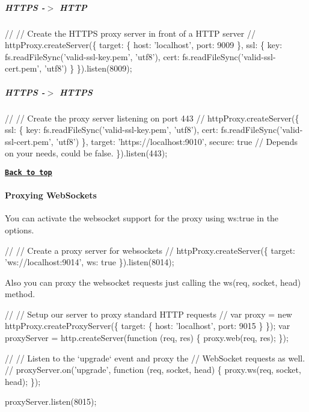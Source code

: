 \subparagraph*{H\+T\+T\+PS -\/$>$ H\+T\+TP}


\begin{DoxyCode}
//
// Create the HTTPS proxy server in front of a HTTP server
//
httpProxy.createServer(\{
  target: \{
    host: 'localhost',
    port: 9009
  \},
  ssl: \{
    key: fs.readFileSync('valid-ssl-key.pem', 'utf8'),
    cert: fs.readFileSync('valid-ssl-cert.pem', 'utf8')
  \}
\}).listen(8009);
\end{DoxyCode}


\subparagraph*{H\+T\+T\+PS -\/$>$ H\+T\+T\+PS}


\begin{DoxyCode}
//
// Create the proxy server listening on port 443
//
httpProxy.createServer(\{
  ssl: \{
    key: fs.readFileSync('valid-ssl-key.pem', 'utf8'),
    cert: fs.readFileSync('valid-ssl-cert.pem', 'utf8')
  \},
  target: 'https://localhost:9010',
  secure: true // Depends on your needs, could be false.
\}).listen(443);
\end{DoxyCode}


{\bfseries \href{#table-of-contents}{\tt Back to top}}

\paragraph*{Proxying Web\+Sockets}

You can activate the websocket support for the proxy using {\ttfamily ws\+:true} in the options.


\begin{DoxyCode}
//
// Create a proxy server for websockets
//
httpProxy.createServer(\{
  target: 'ws://localhost:9014',
  ws: true
\}).listen(8014);
\end{DoxyCode}


Also you can proxy the websocket requests just calling the {\ttfamily ws(req, socket, head)} method.


\begin{DoxyCode}
//
// Setup our server to proxy standard HTTP requests
//
var proxy = new httpProxy.createProxyServer(\{
  target: \{
    host: 'localhost',
    port: 9015
  \}
\});
var proxyServer = http.createServer(function (req, res) \{
  proxy.web(req, res);
\});

//
// Listen to the `upgrade` event and proxy the
// WebSocket requests as well.
//
proxyServer.on('upgrade', function (req, socket, head) \{
  proxy.ws(req, socket, head);
\});

proxyServer.listen(8015);
\end{DoxyCode}



